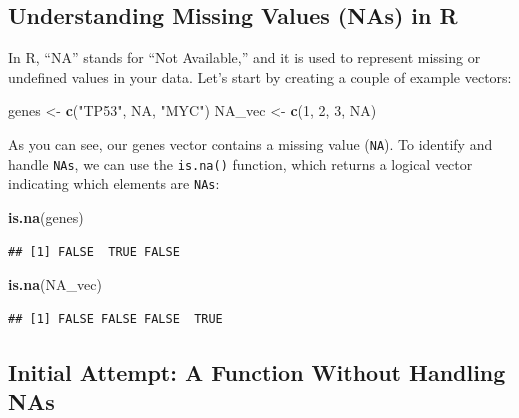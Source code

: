 \documentclass[
]{book}
\newenvironment{Shaded}{\begin{snugshade}}{\end{snugshade}}
\newcommand{\ConstantTok}[1]{\textcolor[rgb]{0.56,0.35,0.01}{#1}}
\newcommand{\DecValTok}[1]{\textcolor[rgb]{0.00,0.00,0.81}{#1}}
\newcommand{\FunctionTok}[1]{\textcolor[rgb]{0.13,0.29,0.53}{\textbf{#1}}}
\newcommand{\NormalTok}[1]{#1}
\newcommand{\OtherTok}[1]{\textcolor[rgb]{0.56,0.35,0.01}{#1}}
\newcommand{\StringTok}[1]{\textcolor[rgb]{0.31,0.60,0.02}{#1}}
\begin{document}
\hypertarget{understanding-missing-values-nas-in-r}{%
\subsection{Understanding Missing Values (NAs) in R}\label{understanding-missing-values-nas-in-r}}

In R, ``NA'' stands for ``Not Available,'' and it is used to represent missing or undefined values in your data. Let's start by creating a couple of example vectors:

\begin{Shaded}
\begin{Highlighting}[]
\NormalTok{genes }\OtherTok{\textless{}{-}} \FunctionTok{c}\NormalTok{(}\StringTok{"TP53"}\NormalTok{, }\ConstantTok{NA}\NormalTok{, }\StringTok{"MYC"}\NormalTok{)}
\NormalTok{NA\_vec }\OtherTok{\textless{}{-}} \FunctionTok{c}\NormalTok{(}\DecValTok{1}\NormalTok{, }\DecValTok{2}\NormalTok{, }\DecValTok{3}\NormalTok{, }\ConstantTok{NA}\NormalTok{)}
\end{Highlighting}
\end{Shaded}

As you can see, our genes vector contains a missing value (\texttt{NA}). To identify and handle \texttt{NAs}, we can use the \texttt{is.na()} function, which returns a logical vector indicating which elements are \texttt{NAs}:

\begin{Shaded}
\begin{Highlighting}[]
\FunctionTok{is.na}\NormalTok{(genes)}
\end{Highlighting}
\end{Shaded}

\begin{verbatim}
## [1] FALSE  TRUE FALSE
\end{verbatim}

\begin{Shaded}
\begin{Highlighting}[]
\FunctionTok{is.na}\NormalTok{(NA\_vec)}
\end{Highlighting}
\end{Shaded}

\begin{verbatim}
## [1] FALSE FALSE FALSE  TRUE
\end{verbatim}

\hypertarget{initial-attempt-a-function-without-handling-nas}{%
\subsection{Initial Attempt: A Function Without Handling NAs}\label{initial-attempt-a-function-without-handling-nas}}
\end{document}
